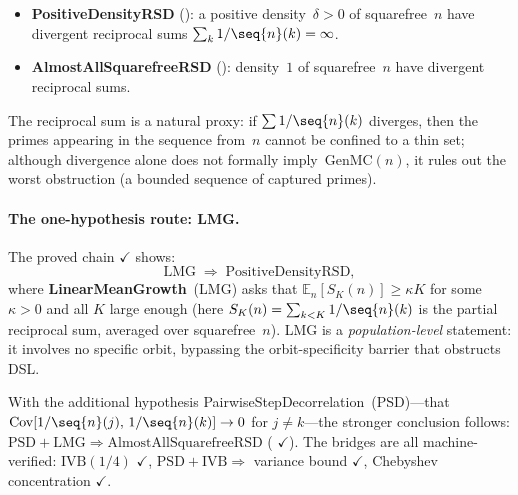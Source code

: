 \begin{itemize}
\item \textbf{PositiveDensityRSD}
  ():
  a positive density~$\delta > 0$ of squarefree~$n$ have divergent
  reciprocal sums $\sum_k 1/\seq{n}(k) = \infty$.

\item \textbf{AlmostAllSquarefreeRSD}
  ():
  density~$1$ of squarefree~$n$ have divergent reciprocal sums.
\end{itemize}

\noindent
The reciprocal sum is a natural proxy: if $\sum 1/\seq{n}(k)$
diverges, then the primes appearing in the sequence from~$n$ cannot be
confined to a thin set; although divergence alone does not formally
imply~$\mathrm{GenMC}(n)$, it rules out the worst obstruction (a
bounded sequence of captured primes).

\paragraph{The one-hypothesis route: LMG.}
The proved chain
{\color{leanink}$\checkmark$} shows:
\[
  \mathrm{LMG} \;\Longrightarrow\; \mathrm{PositiveDensityRSD},
\]
where \textbf{LinearMeanGrowth}~(LMG) asks that
$\mathbb{E}_n[S_K(n)] \geq \kappa K$ for some $\kappa > 0$ and all
$K$ large enough (here $S_K(n) = \sum_{k<K} 1/\seq{n}(k)$ is the
partial reciprocal sum, averaged over squarefree~$n$).
LMG is a \emph{population-level} statement: it involves no specific
orbit, bypassing the orbit-specificity barrier that obstructs DSL\@.

With the additional hypothesis PairwiseStepDecorrelation~(PSD)---that
$\operatorname{Cov}[1/\seq{n}(j),\, 1/\seq{n}(k)] \to 0$ for
$j \neq k$---the stronger conclusion follows:
$\mathrm{PSD} + \mathrm{LMG} \Rightarrow \mathrm{AlmostAllSquarefreeRSD}$
(
{\color{leanink}$\checkmark$}).
The bridges are all machine-verified:
$\mathrm{IVB}(1/4)$ {\color{leanink}$\checkmark$},
$\mathrm{PSD} + \mathrm{IVB} \Rightarrow$ variance bound
{\color{leanink}$\checkmark$},
Chebyshev concentration {\color{leanink}$\checkmark$}.

